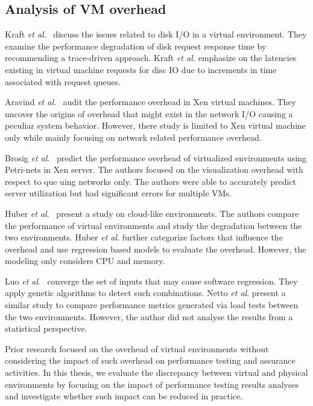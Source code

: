 \subsection{Analysis of VM overhead}

Kraft \textit{et al$.$}~\cite{kraft2011io} discuss the issues related to disk I/O in a virtual environment. They examine the performance degradation of disk request response time by recommending a trace-driven approach. Kraft \textit{et al.} emphasize on the latencies existing in virtual machine requests for disc IO due to increments in time associated with request queues. 

Aravind \textit{et al$.$}~\cite{menon2005diagnosing} audit the performance overhead in Xen virtual machines. They uncover the origins of overhead that might exist in the network I/O causing a peculiar system behavior. However, there study is limited to Xen virtual machine only while mainly focusing on network related performance overhead.

Brosig \textit{et al$.$}~\cite{brosig2013evaluating} predict the performance overhead of virtualized environments using Petri-nets in Xen server. The authors focused on the visualization overhead with respect to que	uing networks only. The authors were able to accurately predict server utilization but had significant errors for multiple VMs.


Huber \textit{et al$.$}~\cite{huber2011evaluating} present a study on cloud-like environments. The authors compare the performance of virtual environments and study the degradation between the two environments. Huber \textit{et al$.$} further categorize factors that influence the overhead and use regression based models to evaluate the overhead. However, the modeling only considers CPU and memory.


Luo \textit{et al$.$}~\cite{Luo:2016:MPR:2901739.2901765} converge the set of inputs that may cause software regression. They apply genetic algorithms to detect such combinations. Netto \textit{et al$.$} \cite{netto2011evaluating} present a similar study to compare performance metrics generated via load tests between the two environments. However, the author did not analyse the results from a statistical perspective.

Prior research focused on the overhead of virtual environments without considering the impact of such overhead on performance testing and assurance activities. In this thesis, we evaluate the discrepancy between virtual and physical environments by focusing on the impact of performance testing results analyses and investigate whether such impact can be reduced in practice.


